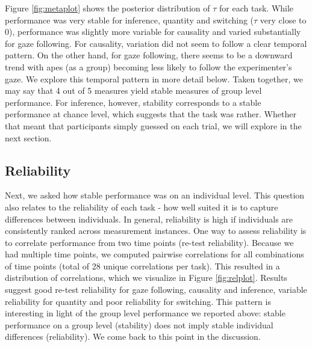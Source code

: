 \documentclass[10pt, letterpaper]{article}
\begin{document}
Figure \ref{fig:metaplot} shows the posterior distribution of \(\tau\)
for each task. While performance was very stable for inference, quantity
and switching (\(\tau\) very close to 0), performance was slightly more
variable for causality and varied substantially for gaze following. For
causality, variation did not seem to follow a clear temporal pattern. On
the other hand, for gaze following, there seems to be a downward trend
with apes (as a group) becoming less likely to follow the experimenter's
gaze. We explore this temporal pattern in more detail below. Taken
together, we may say that 4 out of 5 measures yield stable measures of
group level performance. For inference, however, stability corresponds
to a stable performance at chance level, which suggests that the task
was rather. Whether that meant that participants simply guessed on each
trial, we will explore in the next section.

\hypertarget{reliability}{%
\subsection{Reliability}\label{reliability}}

Next, we asked how stable performance was on an individual level. This
question also relates to the reliability of each task - how well suited
it is to capture differences between individuals. In general,
reliability is high if individuals are consistently ranked across
measurement instances. One way to assess reliability is to correlate
performance from two time points (re-test reliability). Because we had
multiple time points, we computed pairwise correlations for all
combinations of time points (total of 28 unique correlations per task).
This resulted in a distribution of correlations, which we visualize in
Figure \ref{fig:relplot}. Results suggest good re-test reliability for
gaze following, causality and inference, variable reliability for
quantity and poor reliability for switching. This pattern is interesting
in light of the group level performance we reported above: stable
performance on a group level (stability) does not imply stable
individual differences (reliability). We come back to this point in the
discussion.
\end{document}
